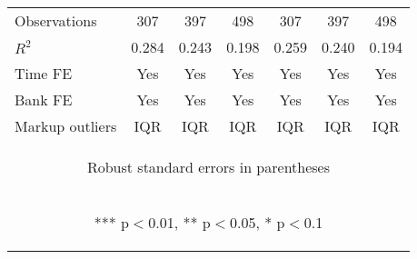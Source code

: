 \begin{tabular}{lcccccc}
Observations & 307 & 397 & 498 & 307 & 397 & 498 \\
$R^2$ & 0.284 & 0.243 & 0.198 & 0.259 & 0.240 & 0.194 \\
Time FE & Yes & Yes & Yes & Yes & Yes & Yes \\
Bank FE & Yes & Yes & Yes & Yes & Yes & Yes \\
 Markup outliers & IQR & IQR & IQR & IQR & IQR & IQR \\ \hline
\multicolumn{7}{c}{\begin{footnotesize} Robust standard errors in parentheses\end{footnotesize}} \\
\multicolumn{7}{c}{\begin{footnotesize} *** p$<$0.01, ** p$<$0.05, * p$<$0.1\end{footnotesize}} \\
\end{tabular}


